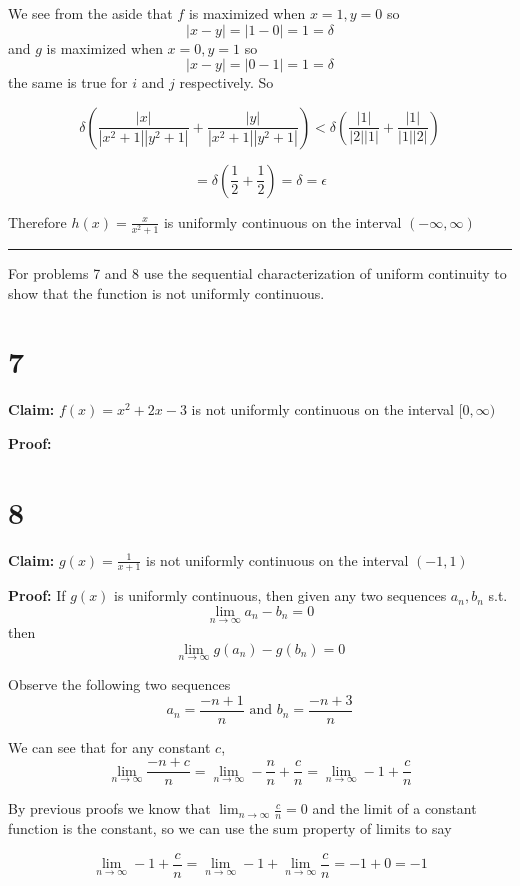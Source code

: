 \documentclass[10pt,letterpaper]{article}
\newcommand\ds{\displaystyle}
\newcommand\qedsym{\hfill \rule{2mm}{2mm}}
\begin{document}
We see from the aside that $f$ is maximized when $x=1, y=0$ so
\[|x-y| = |1-0| = 1 = \delta\]
and $g$ is maximized when $x=0,y=1$ so
\[|x-y| = |0-1| = 1 = \delta\]
the same is true for $i$ and $j$ respectively. So

\[\delta\left(\frac{|x|}{|x^2+1||y^2+1|}+\frac{|y|}{|x^2+1||y^2+1|}\right) < \delta\left(\frac{|1|}{|2||1|}+\frac{|1|}{|1||2|}\right)\]

\[=\delta\left(\frac{1}{2} + \frac{1}{2}\right) = \delta = \epsilon\]

Therefore $h(x) = \frac{x}{x^2+1}$ is uniformly continuous on the interval $(-\infty, \infty)$

\qedsym

\bigskip

For problems 7 and 8 use the sequential characterization of uniform continuity to show that the function is not uniformly continuous.

\section*{7}

\textbf{Claim:} $f(x) = x^2+2x-3$ is not uniformly continuous on the interval $[0, \infty)$

\medskip

\textbf{Proof:}

\section*{8}

\textbf{Claim:} $g(x) = \frac{1}{x+1}$ is not uniformly continuous on the interval $(-1, 1)$

\medskip

\textbf{Proof:} If $g(x)$ is uniformly continuous, then given any two sequences $a_n, b_n$ s.t. \[\ds\lim_{n\to\infty}a_n-b_n = 0\] then \[\ds\lim_{n\to\infty}g(a_n)-g(b_n) = 0\]

Observe the following two sequences
\[a_n = \frac{-n+1}{n} \text{ and } b_n = \frac{-n+3}{n}\]

We can see that for any constant $c$,
\[\lim_{n\to\infty}\frac{-n+c}{n} = \lim_{n\to\infty}-\frac{n}{n} + \frac{c}{n}=\lim_{n\to\infty}-1 + \frac{c}{n}\]

By previous proofs we know that $\ds\lim_{n\to\infty}\frac{c}{n} = 0$ and the limit of a constant function is the constant, so we can use the sum property of limits to say

\[\lim_{n\to\infty}-1 + \frac{c}{n} = \lim_{n\to\infty}-1 + \lim_{n\to\infty}\frac{c}{n}=-1+0=-1\]
\end{document}

